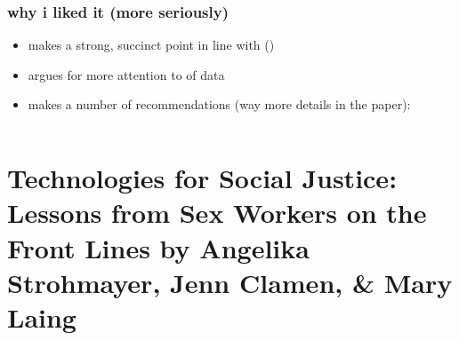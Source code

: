 \documentclass[aspectratio=169,10pt]{beamer} %
\begin{document}
\begin{frame}\frametitle{why i liked it (more seriously)}
    \begin{itemize}
      \item makes a strong, succinct point in line with \citeauthor{bowker2000sorting} {\small ()}
      \item argues for more attention to  of data
      \item makes a number of recommendations (way more details in the paper):
      \begin{enumerate}
        \begin{columns}
        \begin{column}{0.1\textwidth}
        \end{column}
        \end{columns}
      \end{enumerate}
    \end{itemize}
\end{frame}


\section[Technologies for Social Justice: Lessons from Sex Workers on the Front Lines]{Technologies for Social Justice: Lessons from Sex Workers on the Front Lines {\scriptsize \color{Black} by \textbf{Angelika Strohmayer}, \textbf{Jenn Clamen}, \& \textbf{Mary Laing}}}
\end{document}
